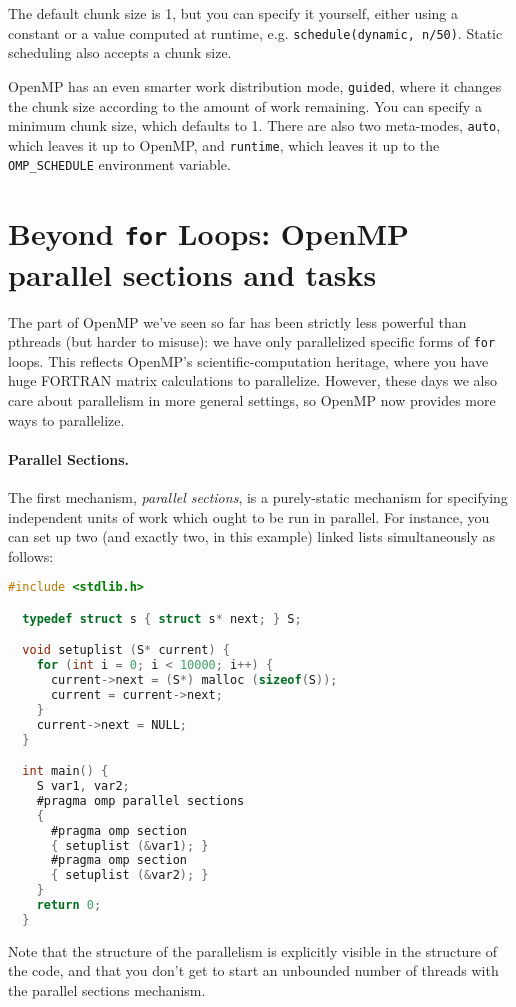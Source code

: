 \documentclass[11pt]{article}
\begin{document}
The default chunk size is 1, but you can specify it yourself, either
using a constant or a value computed at runtime, e.g. 
{\tt schedule(dynamic, n/50)}. Static scheduling also accepts a
chunk size.

OpenMP has an even smarter work distribution mode, {\tt guided}, where
it changes the chunk size according to the amount of work remaining.
You can specify a minimum chunk size, which defaults to 1. There
are also two meta-modes, {\tt auto}, which leaves it up to OpenMP, and
{\tt runtime}, which leaves it up to the \verb+OMP_SCHEDULE+ environment
variable.

\section*{Beyond {\tt for} Loops: OpenMP parallel sections and tasks}
The part of OpenMP we've seen so far has been strictly less powerful
than pthreads (but harder to misuse): we have only parallelized
specific forms of {\tt for} loops. This reflects OpenMP's
scientific-computation heritage, where you have huge FORTRAN matrix
calculations to parallelize. However, these days we also care about
parallelism in more general settings, so OpenMP now provides
more ways to parallelize.

\paragraph{Parallel Sections.} The first mechanism, \emph{parallel sections},
is a purely-static mechanism for specifying independent units of work
which ought to be run in parallel. For instance, you can set up two 
(and exactly two, in this example) linked lists simultaneously as follows:

{\small
\begin{lstlisting}[language=C]
  #include <stdlib.h>

  typedef struct s { struct s* next; } S;

  void setuplist (S* current) {
    for (int i = 0; i < 10000; i++) {
      current->next = (S*) malloc (sizeof(S));
      current = current->next;
    }
    current->next = NULL;
  }

  int main() {
    S var1, var2;
    #pragma omp parallel sections
    {
      #pragma omp section
      { setuplist (&var1); }
      #pragma omp section
      { setuplist (&var2); }
    }
    return 0;
  }
\end{lstlisting}
}
Note that the structure of the parallelism is explicitly visible in the
structure of the code, and that you don't get to start an unbounded 
number of threads with the parallel sections mechanism.
\end{document}
